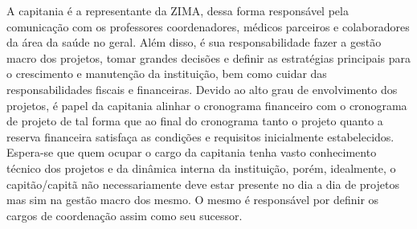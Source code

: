 \documentclass[../poliXuniversity_hospital_(USP)_report.tex]{subfiles}
\begin{document}
A capitania é a representante da ZIMA, dessa forma responsável pela comunicação com os professores coordenadores, médicos parceiros e colaboradores da área da saúde no geral. Além disso, é sua responsabilidade fazer a gestão macro dos projetos, tomar grandes decisões e definir as estratégias principais para o crescimento e manutenção da instituição, bem como cuidar das responsabilidades fiscais e financeiras. Devido ao alto grau de envolvimento dos projetos, é papel da capitania alinhar o cronograma financeiro com o cronograma de projeto de tal forma que ao final do cronograma tanto o projeto quanto a reserva financeira satisfaça as condições e requisitos inicialmente estabelecidos. Espera-se que quem ocupar o cargo da capitania tenha vasto conhecimento técnico dos projetos e da dinâmica interna da instituição, porém, idealmente, o capitão/capitã não necessariamente deve estar presente no dia a dia de projetos mas sim na gestão macro dos mesmo.  O mesmo é responsável por definir os cargos de coordenação assim como seu sucessor.
\end{document}
